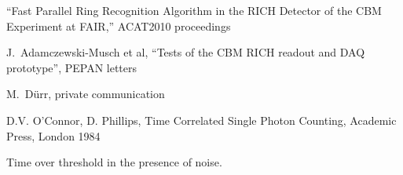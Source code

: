 \begin{thebibliography}{99}
``Fast Parallel Ring Recognition Algorithm in the RICH Detector of the CBM Experiment at FAIR,''
ACAT2010 proceedings


J.~Adamczewski-Musch et al,
``Tests of the CBM RICH readout and DAQ prototype'',
PEPAN letters

M.~D\"urr, private communication

D.V. O’Connor, D. Phillips, Time Correlated Single Photon Counting, Academic Press, London 1984

Time over threshold in the presence of noise.


\end{thebibliography}


